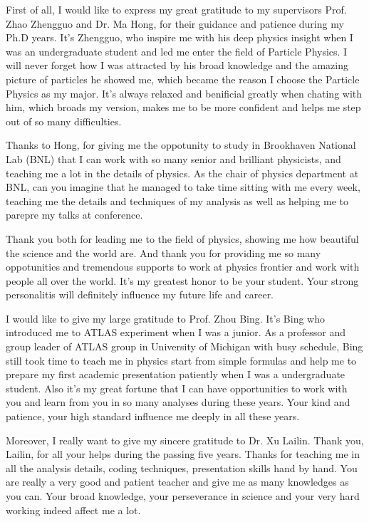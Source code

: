 
\begin{acknowledgments}

First of all, I would like to express my great gratitude to my supervisors Prof. Zhao Zhengguo and Dr. Ma Hong, for their guidance and patience during my Ph.D years.
It's Zhengguo, who inspire me with his deep physics insight when I was an undergraduate student and led me enter the field of Particle Physics.
I will never forget how I was attracted by his broad knowledge and the amazing picture of particles he showed me, which became the reason I choose the Particle Physics as my major.
It's always relaxed and benificial greatly when chating with him, which broads my version, makes me to be more confident and helps me step out of so many difficulties.

Thanks to Hong, for giving me the oppotunity to study in Brookhaven National Lab (BNL) that I can work with so many senior and brilliant physicists, and teaching me a lot in the details of physics.
As the chair of physics department at BNL, can you imagine that he managed to take time sitting with me every week, teaching me the details and techniques of my analysis
as well as helping me to parepre my talks at conference.

Thank you both for leading me to the field of physics, showing me how beautiful the science and the world are. 
And thank you for providing me so many oppotunities and tremendous supports to work at physics frontier and work with people all over the world.
It's my greatest honor to be your student.
Your strong personalitis will definitely influence my future life and career.

I would like to give my large gratitude to Prof. Zhou Bing.
It's Bing who introduced me to ATLAS experiment when I was a junior. 
As a professor and group leader of ATLAS group in University of Michigan with busy schedule, 
Bing still took time to teach me in physics start from simple formulas and help me to prepare my first academic presentation patiently when I was a undergraduate student.
Also it's my great fortune that I can have opportunities to work with you and learn from you in so many analyses during these years.
Your kind and patience, your high standard influence me deeply in all these years.

Moreover, I really want to give my sincere gratitude to Dr. Xu Lailin.
Thank you, Lailin, for all your helps during the passing five years.
Thanks for teaching me in all the analysis details, coding techniques, presentation skills hand by hand.
You are really a very good and patient teacher and give me as many knowledges as you can.
Your broad knowledge, your perseverance in science and your very hard working indeed affect me a lot.


\end{acknowledgments}
